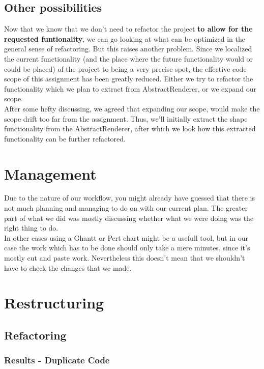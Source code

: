 \documentclass{article}
\begin{document}
\subsection{Other possibilities}

Now that we know that we don't need to refactor the project \textbf{to allow for the requested funtionality}, we can go looking at what can be optimized in the general sense of refactoring. But this raises another problem. Since we localized the current functionality (and the place where the future functionality would or could be placed) of the project to being a very precise spot, the effective code scope of this assignment has been greatly reduced. Either we try to refactor the functionality which we plan to extract from AbstractRenderer, or we expand our scope.\\

After some hefty discussing, we agreed that expanding our scope, would make the scope drift too far from the assignment. Thus, we'll initially extract the shape functionality from the AbstractRenderer, after which we look how this extracted functionality can be further refactored.


\section{Management}

Due to the nature of our workflow, you might already have guessed that there is not much planning and managing to do on with our current plan. The greater part of what we did was mostly discussing whether what we were doing was the right thing to do.\\

In other cases using a Ghantt or Pert chart might be a usefull tool, but in our case the work which has to be done should only take a mere minutes, since it's mostly cut and paste work. Nevertheless this doesn't mean that we shouldn't have to check the changes that we made.

\section{Restructuring}

\subsection{Refactoring}

\subsubsection{Results - Duplicate Code}
\end{document}
